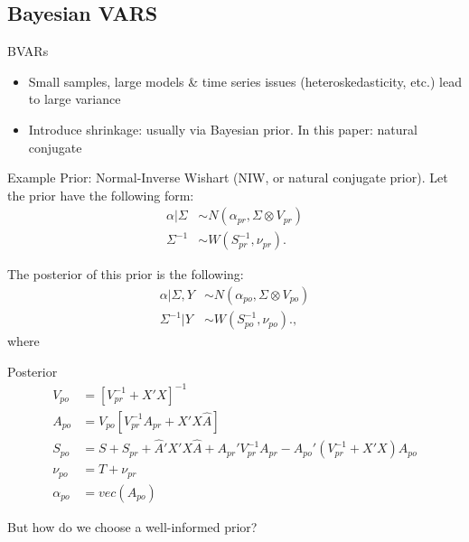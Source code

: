 \documentclass{beamer}
\begin{document}
\subsection{Bayesian VARS}
\begin{frame}{BVARs}
\begin{itemize}
\item Small samples, large models \& time series issues (heteroskedasticity, etc.) lead to large variance
\item Introduce shrinkage: usually via Bayesian prior. In this paper: natural conjugate
\end{itemize}
Example Prior: Normal-Inverse Wishart (NIW, or natural conjugate prior). Let the prior have the following form:
\begin{align}
\alpha | \Sigma &\sim N(\alpha_{pr},\Sigma \otimes V_{pr}) \label{alphpr} \\
\Sigma^{-1} &\sim W(S_{pr}^{-1},\nu_{pr}). \label{Sigpr}
\end{align}

The posterior of this prior is the following:
\begin{align}
\alpha | \Sigma,Y &\sim N(\alpha_{po},\Sigma \otimes V_{po}) \label{alphpo} \\
\Sigma^{-1}| Y &\sim W(S_{po}^{-1},\nu_{po}). \label{Sigpo},
\end{align}
where
\end{frame}
\begin{frame}{Posterior}
\begin{align*}
V_{po} &= [V_{pr}^{-1} + X'X]^{-1} \\
A_{po} &= V_{po}[V_{pr}^{-1}A_{pr} + X'X\hat{A}] \\
S_{po} &= S + S_{pr} + \hat{A}'X'X\hat{A} + A_{pr}' V_{pr}^{-1} A_{pr} - A_{po}' (V_{pr}^{-1} + X'X)A_{po} \\
\nu_{po} &= T + \nu_{pr} \\
\alpha_{po} &= vec(A_{po})
\end{align*}

But how do we choose a well-informed prior?
\end{frame}
\end{document}
